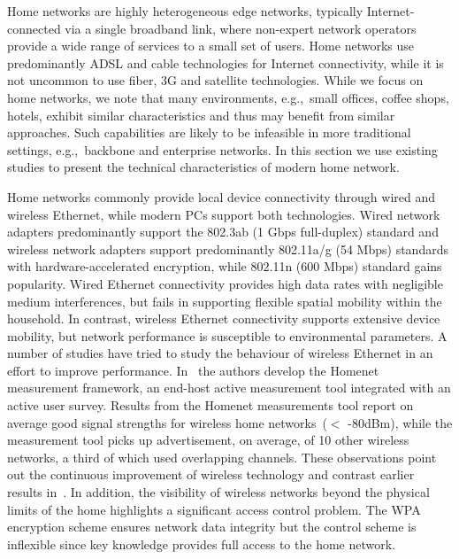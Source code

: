 Home networks are highly heterogeneous edge networks, typically
Internet-connected via a single broadband link, where non-expert network
operators provide a wide range of services to a small set of users.  Home
networks use predominantly ADSL and cable technologies for Internet
connectivity, while it is not uncommon to use fiber, 3G and satellite
technologies.  While we focus on home networks, we note that many environments,
e.g.,~small offices, coffee shops, hotels, exhibit similar characteristics and
thus may benefit from similar approaches. Such capabilities are likely to be
infeasible in more traditional settings, e.g.,~backbone and enterprise networks.
In this section we use existing studies to present the technical characteristics
of modern home network. 

Home networks commonly provide local device connectivity through wired and
wireless Ethernet, while modern PCs support both technologies. Wired network
adapters predominantly support the 802.3ab (1 Gbps full-duplex) standard and
wireless network adapters support predominantly 802.11a/g (54 Mbps) standards
with hardware-accelerated encryption, while 802.11n (600 Mbps) standard gains
popularity. Wired Ethernet connectivity provides high data rates with negligible
medium interferences, but fails in supporting flexible spatial mobility within
the household. In contrast, wireless Ethernet connectivity supports extensive
device mobility, but network performance is susceptible to environmental
parameters.  A number of studies have tried to study the behaviour of wireless
Ethernet in an effort to improve performance. In~\cite{homenetProfiler} the
authors develop the Homenet measurement framework, an end-host active
measurement tool integrated with an active user survey.  Results from the
Homenet measurements tool report on average good signal strengths for wireless
home networks~($<$ -80dBm), while the measurement tool picks up advertisement,
on average, of 10 other wireless networks, a third of which used overlapping
channels.  These observations point out the continuous improvement of wireless
technology and contrast earlier results in~\cite{Yarvis05characterizationof}.
In addition, the visibility of wireless networks beyond the physical limits of
the home highlights a significant access control problem. The WPA encryption scheme
ensures network data integrity but the control scheme is inflexible since key
knowledge provides full access to the home network.

